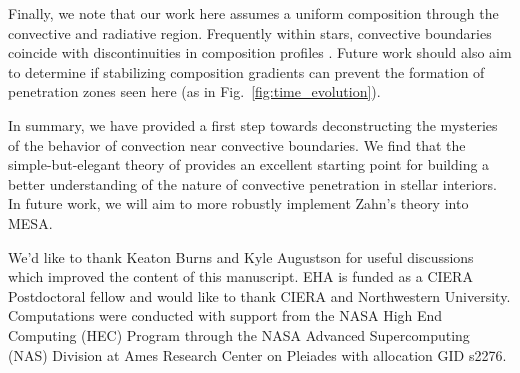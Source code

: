 \documentclass{aastex631}
\begin{document}
Finally, we note that our work here assumes a uniform composition through the convective and radiative region.
Frequently within stars, convective boundaries coincide with discontinuities in composition profiles \citep{salaris_cassisi_2017}.
Future work should also aim to determine if stabilizing composition gradients can prevent the formation of penetration zones seen here (as in Fig.~\ref{fig:time_evolution}).

In summary, we have provided a first step towards deconstructing the mysteries of the behavior of convection near convective boundaries.
We find that the simple-but-elegant theory of \citet{zahn1991} provides an excellent starting point for building a better understanding of the nature of convective penetration in stellar interiors.
In future work, we will aim to more robustly implement Zahn's theory into MESA.





\begin{acknowledgments}
We'd like to thank Keaton Burns and Kyle Augustson for useful discussions which improved the content of this manuscript.
EHA is funded as a CIERA Postdoctoral fellow and would like to thank CIERA and Northwestern University. 
Computations were conducted with support from the NASA High End Computing (HEC) Program through the NASA Advanced Supercomputing (NAS) Division at Ames Research Center on Pleiades with allocation GID s2276.
\end{acknowledgments}


\appendix
\end{document}

